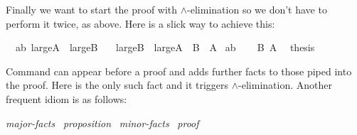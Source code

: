 \begin{isabellebody}
\begin{isamarkuptext}
Finally we want to start the proof with $\land$-elimination so we
don't have to perform it twice, as above. Here is a slick way to
achieve this:%
\end{isamarkuptext}%
\isamarkuptrue%
\isamarkupfalse%
\ \ ab{}\ {}large{}A\ {}\ large{}B{}\isanewline
\ \ \ {}large{}B\ {}\ large{}A{}\ {}\ {}{}B\ {}\ {}A{}{}\isanewline
%
\isadelimproof
%
\endisadelimproof
%
\isatagproof
{}\isamarkupfalse%
\ ab\isanewline
{}\isamarkupfalse%
\isanewline
\ \ \isamarkupfalse%
\ {}{}B{}\ {}{}A{}\ \isamarkupfalse%
\ {}thesis\ \isamarkupfalse%
\isanewline
{}\isamarkupfalse%
%
\endisatagproof
{\isafoldproof}%
%
\isadelimproof
%
\endisadelimproof
%
\begin{isamarkuptext}%
\noindent Command  can appear before a proof
and adds further facts to those piped into the proof. Here 
is the only such fact and it triggers $\land$-elimination. Another
frequent idiom is as follows:
\begin{center}
 \emph{major-facts}~
 \emph{proposition}~
 \emph{minor-facts}~
\emph{proof}
\end{center}


\end{isamarkuptext}
\end{isabellebody}

